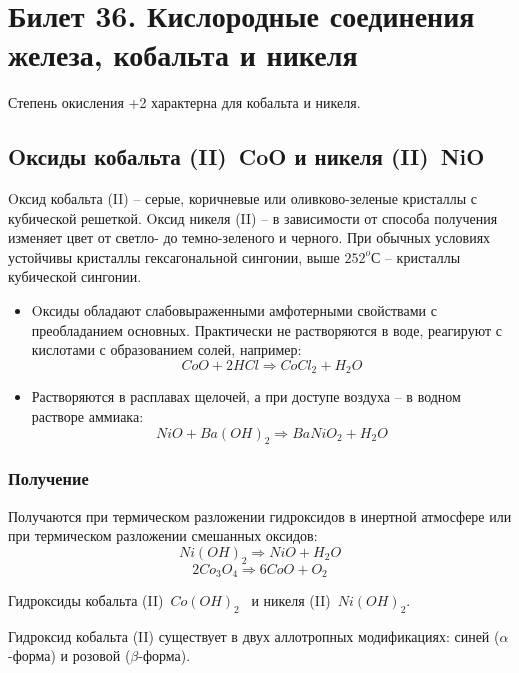 \documentclass[11pt]{article}
\begin{document}
\section{Билет 36. Кислородные соединения железа, кобальта и никеля}

Степень окисления +2 характерна для кобальта и никеля.

\subsection{Oксиды кобальта (II) CoO и никеля (II) NiO}

Oксид кобальта (II) – серые, коричневые или оливково-зеленые кристаллы с
кубической решеткой. Oксид никеля (II) – в зависимости от способа
получения изменяет цвет от светло- до темно-зеленого и черного. При
обычных условиях устойчивы кристаллы гексагональной сингонии, выше
$252 ^oС$ – кристаллы кубической сингонии.
\begin{itemize}
\item Oксиды обладают слабовыраженными амфотерными свойствами с
преобладанием основных. Практически не растворяются в воде, реагируют
с кислотами с образованием солей, например:
$$CoO + 2HCl \Rightarrow CoCl _2  + H _2 O$$
\item Растворяются в расплавах щелочей, а при доступе воздуха – в водном
растворе аммиака:
$$NiO + Ba(OH) _2  \Rightarrow BaNiO _2  + H _2 O$$
\end{itemize}

\subsubsection{Получение}
Получаются при термическом разложении гидроксидов в инертной
атмосфере или при термическом разложении смешанных оксидов:
$$Ni(OH) _2  \Rightarrow NiO + H _2 O$$
$$2Co _3 O _4  \Rightarrow 6CoO + O _2$$

Гидроксиды кобальта (II) $Co(OH) _2$  и никеля (II) $Ni(OH) _2$.

Гидроксид кобальта (II) существует в двух аллотропных модификациях: синей
($\alpha$-форма) и розовой ($\beta$-форма).
\end{document}
